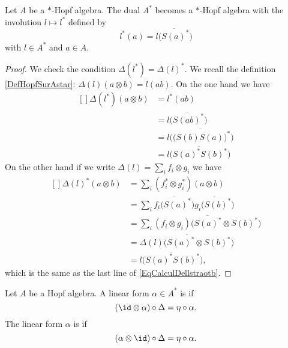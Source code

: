 \begin{proposition}     \label{PropAstarstaralg}
    Let \( A\) be a \( *\)-Hopf algebra. The dual \( A^*\) becomes a \( *\)-Hopf algebra with the involution \( l\mapsto l^*\) defined by
    \begin{equation}
        l^*(a)=\overline{ l\big( S(a)^* \big) }
    \end{equation}
    with \( l\in A^*\) and \( a\in A\).
\end{proposition}

\begin{proof}
    We check the condition \( \Delta(l^*)=\Delta(l)^*\). We recall the definition \eqref{DefHopfSurAstar}: \( \Delta(l)(a\otimes b)=l(ab)\). On the one hand we have
    \begin{equation}        \label{EqCalculDellstraotb}
        \begin{aligned}[]
            \Delta(l^*)(a\otimes b)&=l^*(ab)\\
            &=\overline{ l\big( S(ab)^* \big) }\\
            &=\overline{ l\Big(   \big( S(b)S(a) \big)^* \Big) }\\
            &=\overline{ l\big( S(a)^*S(b)^* \big) }
        \end{aligned}
    \end{equation}
    On the other hand if we write \( \Delta(l)=\sum_if_i\otimes g_i\) we have
    \begin{equation}
        \begin{aligned}[]
            \Delta(l)^*(a\otimes b)&=\sum_i(f_i^*\otimes g_i^*)(a\otimes b)\\
            &=\sum_i\overline{ f_i\big( S(a)^* \big) }\overline{ g_i\big( S(b)^* \big)}\\
            &=\sum_i\overline{ (f_i\otimes g_i)\big( S(a)^*\otimes S(b)^* \big) }\\
            &=\overline{ \Delta(l)\big( S(a)^*\otimes S(b)^* \big) }\\
            &=\overline{ l\big( S(a)^*S(b)^* \big) },
        \end{aligned}
    \end{equation}
    which is the same as the last line of \eqref{EqCalculDellstraotb}.
\end{proof}

Let \( A\) be a Hopf algebra. A linear form \( \alpha\in A^*\) is  if
\begin{equation}
    (\id\otimes\alpha)\circ\Delta=\eta\circ\alpha.
\end{equation}
The linear form \( \alpha\) is  if
\begin{equation}
    (\alpha\otimes\id)\circ\Delta=\eta\circ\alpha.
\end{equation}


